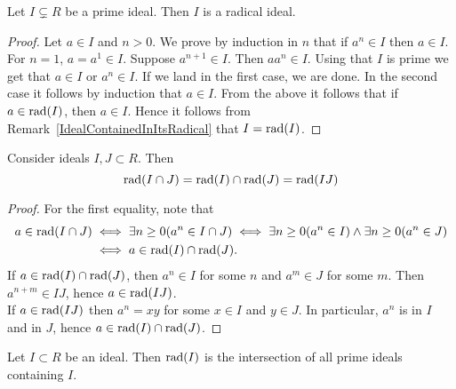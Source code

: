 \begin{lemma}\label{PrimeIdealIsRadical}
    Let $I\subsetneq R$ be a prime ideal. Then $I$ is a radical ideal.
\end{lemma}
\begin{proof}
    Let $a\in I$ and $n>0$. We prove by induction in $n$ that if $a^n \in I$ then $a \in I$. For $n=1$, $a = a^1\in I$. Suppose $a^{n+1}\in I$. Then $aa^n\in I$. Using that $I$ is prime we get that $a \in I$ or $a^n \in I$. If we land in the first case, we are done. In the second case it follows by induction that $a \in I$.   
    From the above it follows that if $a \in \mathrm{rad}(I)$, then $a \in I$. Hence it follows from Remark~\ref{IdealContainedInItsRadical} that $I = \mathrm{rad}(I)$.
\end{proof}
\begin{lemma}
    Consider ideals $I,J\subset R$. Then 
    $$
        \mathrm{rad}(I\cap J) = \mathrm{rad}(I)\cap \mathrm{rad}(J) = \mathrm{rad}(IJ)
    $$
\end{lemma}
\begin{proof}
    For the first equality, note that 
    \begin{align*}
        a\in \mathrm{rad}(I\cap J) &\iff \exists n\geq 0(a^n \in I\cap J) \iff \exists n\geq 0(a^n\in I) \wedge \exists n\geq 0(a^n \in J)\\ &\iff a\in \mathrm{rad}(I)\cap \mathrm{rad}(J).
    \end{align*}
    If $a\in \mathrm{rad}(I)\cap \mathrm{rad}(J)$, then $a^n\in I$ for some $n$ and $a^m\in J$ for some $m$. Then $a^{n+m}\in IJ$, hence $a\in \mathrm{rad}(IJ)$.\\
    If $a\in \mathrm{rad}(IJ)$ then $a^n = xy$ for some $x\in I$ and $y\in J$. In particular, $a^n$ is in $I$ and in $J$, hence $a\in \mathrm{rad}(I)\cap \mathrm{rad}(J)$. 
\end{proof}
\begin{lemma}\label{RadicalOfIdealIsIntersectionOfAllPrimeIdealsContainingIt}
    Let $I\subset R$ be an ideal. Then $\mathrm{rad}(I)$ is the intersection of all prime ideals containing $I$. 
\end{lemma}
